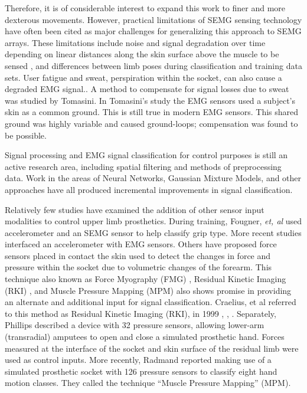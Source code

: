 \documentclass[twocolumn]{sagej}
\begin{document}
Therefore, it is of considerable interest to expand this work to finer and more dexterous movements. However, practical limitations of SEMG sensing technology have often been cited as major challenges for generalizing this approach to SEMG arrays. These limitations include noise and signal degradation over time depending on linear distances along the skin surface above the muscle to be sensed \cite{AsghariOskoei2007b, Hargrove2006b, Young2011}, and differences between limb poses during classification  and training  data sets\cite{Scheme2010a}.  User fatigue and sweat, perspiration within the socket, can also cause a degraded EMG signal.\cite{Ray1983, Abdoli-Eramaki2012, Dimitrova2003}.   A method to compensate for signal losses due to sweat was studied by Tomasini\cite{Tomasini2015}.  In Tomasini's study the EMG sensors used a subject's skin as a common ground. This is still true in modern EMG sensors.  This shared ground was highly variable and caused ground-loops; compensation was found to be possible. \par \noindent 
Signal processing and EMG signal classification for control purposes is still an active research area, including spatial filtering\cite{Hahne2012} and methods of preprocessing data\cite{Hargrove2009}.  Work in the areas of Neural Networks\cite{Chan2000a, Mobasser2005}, Gaussian Mixture Models\cite{Chan2003a, Huang2005}, and other approaches have all produced incremental improvements in signal classification\cite{Derry:2014:EMP:2559636.2559685, Oskoei2006a, Oskoei2008b, Reaz02006}.  \par \noindent 
Relatively few studies have examined the addition of other sensor input modalities to control upper limb prosthetics.   During training, Fougner, \textit{et, al} used accelerometer and an SEMG sensor to help classify grip type\cite{Fougner2011}.  More recent studies interfaced an accelerometer with EMG sensors\cite{Assad2013, Wolf02013}.  Others have proposed force sensors placed in contact the skin used to detect the changes in force and pressure within the socket due to volumetric changes of the forearm.  This technique also known as Force Myography (FMG) \cite{Wininger02008}, Residual Kinetic Imaging (RKI) \cite{Phillips02005}, and Muscle Pressure Mapping (MPM) \cite{Radmand02014} also shows promise in providing an alternate and additional input for signal classification. Craelius, et al referred to this method as Residual Kinetic Imaging (RKI), in 1999 \cite{Craelius01999}, \cite{Curcie02001}, \cite{Phillips02005}.  Separately, Phillips described a device with 32 pressure sensors, allowing lower-arm (transradial) amputees to open and close a simulated prosthetic hand.  Forces measured at the interface of the socket and skin surface of the residual limb were used as control inputs\cite{Phillips02005}.  More recently, Radmand reported making use of a simulated prosthetic socket with 126 pressure sensors to classify eight hand motion classes.  They called the technique ``Muscle Pressure Mapping'' (MPM)\cite{MEC02014}.  \par \noindent
\end{document}
